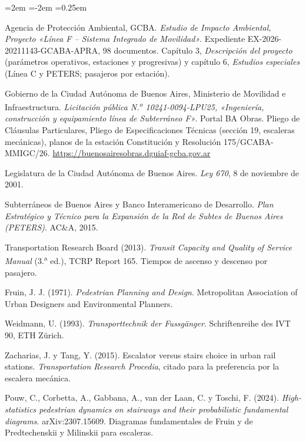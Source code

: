 \documentclass{article}
\begin{document}
\begin{list}{}{\leftmargin=2em \itemindent=-2em \itemsep=0.25em}
\item[] [10] Agencia de Protección Ambiental, GCBA. \textit{Estudio de Impacto Ambiental, Proyecto «Línea
  F -- Sistema Integrado de Movilidad»}. Expediente EX-2026-20211143-GCABA-APRA, 98 documentos. Capítulo 3,
  \textit{Descripción del proyecto} (parámetros operativos, estaciones y progresivas) y capítulo 6,
  \textit{Estudios especiales} (Línea C y PETERS; pasajeros por estación).

\item[] [11] Gobierno de la Ciudad Autónoma de Buenos Aires, Ministerio de Movilidad e Infraestructura.
  \textit{Licitación pública N.\textsuperscript{o} 10241-0094-LPU25, «Ingeniería, construcción y
  equipamiento línea de Subterráneo F»}. Portal BA Obras. Pliego de Cláusulas Particulares, Pliego de
  Especificaciones Técnicas (sección 19, escaleras mecánicas), planos de la estación Constitución y
  Resolución 175/GCABA-MMIGC/26. \url{https://buenosairesobras.dguiaf-gcba.gov.ar}

\item[] [12] Legislatura de la Ciudad Autónoma de Buenos Aires. \textit{Ley 670}, 8 de noviembre de 2001.

\item[] [13] Subterráneos de Buenos Aires y Banco Interamericano de Desarrollo. \textit{Plan Estratégico y
  Técnico para la Expansión de la Red de Subtes de Buenos Aires (PETERS)}. AC\&A, 2015.

\item[] [14] Transportation Research Board (2013). \textit{Transit Capacity and Quality of Service Manual}
  (3.\textsuperscript{a} ed.), TCRP Report 165. Tiempos de ascenso y descenso por pasajero.

\item[] [15] Fruin, J. J. (1971). \textit{Pedestrian Planning and Design}. Metropolitan Association of
  Urban Designers and Environmental Planners.

\item[] [16] Weidmann, U. (1993). \textit{Transporttechnik der Fussgänger}. Schriftenreihe des IVT 90, ETH
  Zürich.

\item[] [17] Zacharias, J. y Tang, Y. (2015). Escalator versus stairs choice in urban rail stations.
  \textit{Transportation Research Procedia}, citado para la preferencia por la escalera mecánica.

\item[] [18] Pouw, C., Corbetta, A., Gabbana, A., van der Laan, C. y Toschi, F. (2024). \textit{High-statistics
  pedestrian dynamics on stairways and their probabilistic fundamental diagrams}. arXiv:2307.15609. Diagramas
  fundamentales de Fruin y de Predtechenskii y Milinskii para escaleras.


\end{list}
\end{document}

